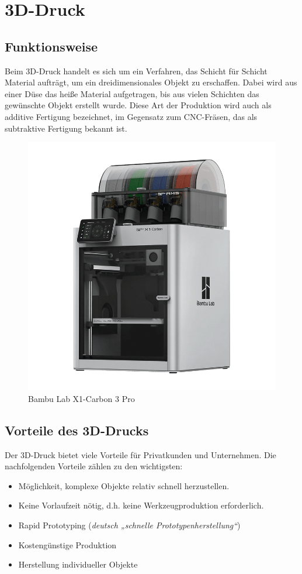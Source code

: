 \newpage
\section{3D-Druck}
\subsection{Funktionsweise}
Beim 3D-Druck handelt es sich um ein Verfahren, das Schicht für Schicht Material aufträgt, um ein dreidimensionales Objekt zu erschaffen. Dabei wird aus einer Düse das heiße Material aufgetragen, bis aus vielen Schichten das gewünschte Objekt erstellt wurde. Diese Art der Produktion wird auch als additive Fertigung bezeichnet, im Gegensatz zum CNC-Fräsen, das als subtraktive Fertigung bekannt ist.


\begin{figure}[H]
	\centering
	\includegraphics[width=0.5\linewidth]{images/3D-Drucker.png}
	\caption[Bambu Lab X1-Carbon 3 Pro]{Bambu Lab X1-Carbon 3 Pro}
	\label{fig:3D-Druck}
\end{figure}


\subsection{Vorteile des 3D-Drucks}
Der 3D-Druck bietet viele Vorteile für Privatkunden und Unternehmen. Die nachfolgenden Vorteile zählen zu den wichtigsten:
\begin{itemize}
	\item Möglichkeit, komplexe Objekte relativ schnell herzustellen.
	\item Keine Vorlaufzeit nötig, d.h. keine Werkzeugproduktion erforderlich.
	\item Rapid Prototyping (\textit{deutsch „schnelle Prototypenherstellung“})
	\item Kostengünstige Produktion
	\item Herstellung individueller Objekte
\end{itemize} \parencite{3DDruckVorteile}


